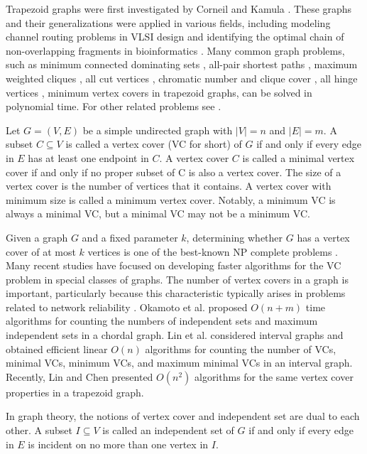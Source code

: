 \documentclass[11pt,letter]{article}
\begin{document}
Trapezoid graphs were first investigated by Corneil and Kamula \cite{CoKa87}. These graphs and
their generalizations were applied in various fields, including modeling channel routing problems
in VLSI design \cite{DaGoPi88} and identifying the optimal chain of non-overlapping fragments in
bioinformatics \cite{AbOh05}. Many common graph problems, such as minimum connected dominating sets
\cite{TsLiHs07}, all-pair shortest paths \cite{MoPaPa02}, maximum weighted cliques \cite{BePaPa02},
all cut vertices \cite{HoPaPa04}, chromatic number and clique cover \cite{FeMuWe97}, all hinge
vertices \cite{BePaPa03}, minimum vertex covers \cite{LiCh09} in trapezoid graphs, can be solved in
polynomial time. For other related problems see \cite{ChCo96,CrGa10,Li94,Li95}.

Let $G = (V, E)$ be a simple undirected graph with $|V| = n$ and $|E| = m$. A subset $C \subseteq
V$ is called a vertex cover (VC for short) of $G$ if and only if every edge in $E$ has at least one
endpoint in $C$. A vertex cover $C$ is called a minimal vertex cover if and only if no proper
subset of C is also a vertex cover. The size of a vertex cover is the number of vertices that it
contains. A vertex cover with minimum size is called a minimum vertex cover. Notably, a minimum VC
is always a minimal VC, but a minimal VC may not be a minimum VC.

Given a graph $G$ and a fixed parameter $k$, determining whether $G$ has a vertex cover of at most
$k$ vertices is one of the best-known NP complete problems \cite{Ka72}. Many recent studies have
focused on developing faster algorithms for the VC problem in special classes of graphs. The number
of vertex covers in a graph is important, particularly because this characteristic typically arises
in problems related to network reliability \cite{PrBa83}. Okamoto et al. \cite{OkUnUe05} proposed
$O(n + m)$ time algorithms for counting the numbers of independent sets and maximum independent
sets in a chordal graph. Lin et al. \cite{Li07,LiCh08} considered interval graphs and obtained
efficient linear $O (n)$ algorithms for counting the number of VCs, minimal VCs, minimum VCs, and
maximum minimal VCs in an interval graph. Recently, Lin and Chen \cite{LiCh09} presented $O (n^2)$
algorithms for the same vertex cover properties in a trapezoid graph.

In graph theory, the notions of vertex cover and independent set are dual to each other. A subset
$I \subseteq V$ is called an independent set of $G$ if and only if every edge in $E$ is incident on
no more than one vertex in $I$.
\end{document}
